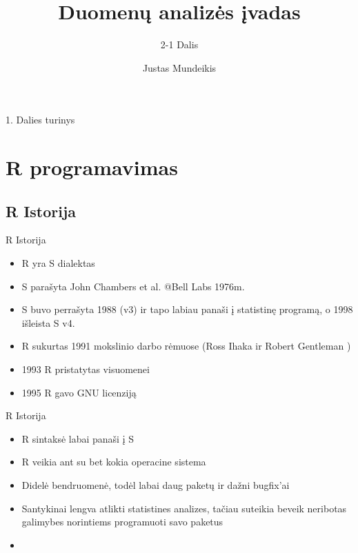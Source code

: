 \documentclass[11pt,xcolor=table]{beamer}
\author{Justas Mundeikis}
\title{Duomenų analizės įvadas}
\subtitle{2-1 Dalis}
\begin{document}

\begin{frame}
\titlepage
\end{frame}


\begin{frame}{1. Dalies turinys}
\tableofcontents
\end{frame}

\section{R programavimas}
\subsection{R Istorija}

\begin{frame}{R Istorija}
\begin{itemize}
\item R yra S dialektas
\item S parašyta John Chambers et al. @Bell Labs 1976m.
\item S buvo perrašyta 1988 (v3) ir tapo labiau panaši į statistinę programą, o 1998 išleista S v4.
\item R sukurtas 1991 mokslinio darbo rėmuose (Ross Ihaka ir Robert Gentleman )
\item 1993 R pristatytas visuomenei
\item 1995 R gavo GNU licenziją
\end{itemize}
\end{frame}


\begin{frame}{R Istorija}
\begin{itemize}
\item R sintaksė labai panaši į S 
\item R veikia ant su bet kokia operacine sistema
\item Didelė bendruomenė, todėl labai daug paketų ir dažni bugfix'ai
\item Santykinai lengva atlikti statistines analizes, tačiau suteikia beveik neribotas galimybes norintiems programuoti savo paketus
\item \href{https://www.gnu.org/philosophy/philosophy.html}{\color{blue}{Philosophy of the GNU Project}}
\end{itemize}
\end{frame}
\end{document}
